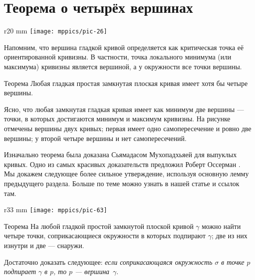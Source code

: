 \section{Теорема о четырёх вершинах}

{

\begin{wrapfigure}{r}{20 mm}
\vskip-8mm
\centering
\texttt{[image: mppics/pic-26]}
\vskip0mm
\end{wrapfigure}

Напомним, что вершина гладкой кривой определяется как критическая точка её ориентированной кривизны.
В частности, точка локального минимума (или максимума) кривизны является вершиной,
а у окружности все точки вершины.

\begin{thm}{Теорема}\label{thm:4-vert}
Любая гладкая простая замкнутая плоская кривая имеет хотя бы четыре вершины.
\end{thm}

}

Ясно, что любая замкнутая гладкая кривая имеет как минимум две вершины --- точки, в которых достигаются минимум и максимум кривизны.
На рисунке отмечены вершины двух кривых;
первая имеет одно самопересечение и ровно две вершины;
у второй четыре вершины и нет самопересечений.

Изначально теорема была доказана Сьямадасом Мухопадхьяей \cite{mukhopadhyaya} для выпуклых кривых.
Одно из самых красивых доказательств предложил Роберт Оссерман \cite{osserman}.
Мы докажем следующее более сильное утверждение, используя основную лемму предыдущего раздела.
Больше по теме можно узнать в нашей статье \cite{petrunin-zamora:moon} и ссылок там.

{

\begin{wrapfigure}[7]{r}{33 mm}
\vskip-6mm
\centering
\texttt{[image: mppics/pic-63]}
\vskip0mm
\end{wrapfigure}

\begin{thm}{Теорема}\label{thm:4-vert-supporting}
На любой гладкой простой замкнутой плоской кривой $\gamma$ можно найти четыре точки, соприкасающиеся окружности в которых подпирают $\gamma$; две из них изнутри и две --- снаружи.
\end{thm}


Достаточно доказать следующее: \textit{если соприкасающаяся окружность $\sigma$ в точке $p$ подпирает $\gamma$ в $p$, то $p$ --- вершина~$\gamma$}.

}

